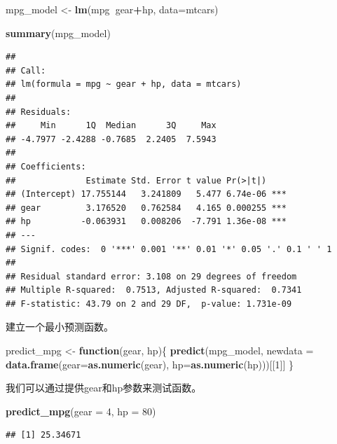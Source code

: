 \documentclass[]{book}
\newenvironment{Shaded}{\begin{snugshade}}{\end{snugshade}}
\newcommand{\KeywordTok}[1]{\textcolor[rgb]{0.13,0.29,0.53}{\textbf{#1}}}
\newcommand{\DataTypeTok}[1]{\textcolor[rgb]{0.13,0.29,0.53}{#1}}
\newcommand{\DecValTok}[1]{\textcolor[rgb]{0.00,0.00,0.81}{#1}}
\newcommand{\StringTok}[1]{\textcolor[rgb]{0.31,0.60,0.02}{#1}}
\newcommand{\ControlFlowTok}[1]{\textcolor[rgb]{0.13,0.29,0.53}{\textbf{#1}}}
\newcommand{\OperatorTok}[1]{\textcolor[rgb]{0.81,0.36,0.00}{\textbf{#1}}}
\newcommand{\NormalTok}[1]{#1}
\begin{document}
\begin{Shaded}
\begin{Highlighting}[]
\NormalTok{mpg_model <-}\StringTok{ }\KeywordTok{lm}\NormalTok{(mpg}\OperatorTok{~}\NormalTok{gear}\OperatorTok{+}\NormalTok{hp, }\DataTypeTok{data=}\NormalTok{mtcars)}

\KeywordTok{summary}\NormalTok{(mpg_model)}
\end{Highlighting}
\end{Shaded}

\begin{verbatim}
## 
## Call:
## lm(formula = mpg ~ gear + hp, data = mtcars)
## 
## Residuals:
##     Min      1Q  Median      3Q     Max 
## -4.7977 -2.4288 -0.7685  2.2405  7.5943 
## 
## Coefficients:
##              Estimate Std. Error t value Pr(>|t|)    
## (Intercept) 17.755144   3.241809   5.477 6.74e-06 ***
## gear         3.176520   0.762584   4.165 0.000255 ***
## hp          -0.063931   0.008206  -7.791 1.36e-08 ***
## ---
## Signif. codes:  0 '***' 0.001 '**' 0.01 '*' 0.05 '.' 0.1 ' ' 1
## 
## Residual standard error: 3.108 on 29 degrees of freedom
## Multiple R-squared:  0.7513, Adjusted R-squared:  0.7341 
## F-statistic: 43.79 on 2 and 29 DF,  p-value: 1.731e-09
\end{verbatim}

建立一个最小预测函数。

\begin{Shaded}
\begin{Highlighting}[]
\NormalTok{predict_mpg <-}\StringTok{ }\ControlFlowTok{function}\NormalTok{(gear, hp)\{}
  \KeywordTok{predict}\NormalTok{(mpg_model, }
          \DataTypeTok{newdata =} \KeywordTok{data.frame}\NormalTok{(}\DataTypeTok{gear=}\KeywordTok{as.numeric}\NormalTok{(gear), }
                               \DataTypeTok{hp=}\KeywordTok{as.numeric}\NormalTok{(hp)))[[}\DecValTok{1}\NormalTok{]]}
\NormalTok{\}}
\end{Highlighting}
\end{Shaded}

我们可以通过提供gear和hp参数来测试函数。

\begin{Shaded}
\begin{Highlighting}[]
\KeywordTok{predict_mpg}\NormalTok{(}\DataTypeTok{gear =} \DecValTok{4}\NormalTok{, }\DataTypeTok{hp =} \DecValTok{80}\NormalTok{)}
\end{Highlighting}
\end{Shaded}

\begin{verbatim}
## [1] 25.34671
\end{verbatim}
\end{document}

